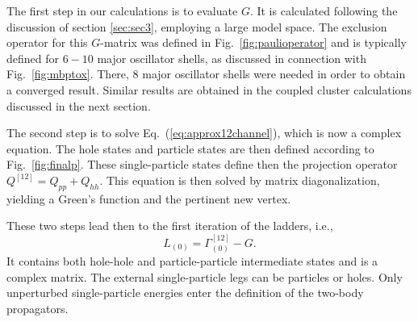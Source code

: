 \documentclass[twoside,12pt]{article}
\begin{document}
The first step in our calculations is to evaluate $G$.  It is 
calculated following the discussion of section \ref{sec:sec3}, employing a
large model space.
The exclusion operator for this $G$-matrix was defined in
Fig.~\ref{fig:paulioperator} and is typically defined for $6-10$ major oscillator shells,
as discussed in connection with Fig.~\ref{fig:mbptox}. There, 8 major oscillator shells
were needed in order to obtain a converged result. Similar results are obtained
in the coupled cluster calculations discussed in the next section.

The second step is to solve Eq.\ (\ref{eq:approx12channel}),
which is now a complex equation. 
The hole states and particle states are then defined according to Fig.~\ref{fig:finalp}.
These single-particle states define then the projection operator  $Q^{[12]}=Q_{pp}+Q_{hh}$.
This equation is then solved by matrix diagonalization, yielding a Green's function and the 
pertinent new vertex.

These two steps lead then to the first iteration of
the ladders, i.e.,
\begin{equation}
     L_{(0)}=\Gamma^{[12]}_{(0)}-G.
\end{equation} 
It contains both hole-hole and particle-particle intermediate
states and is a complex matrix. The external single-particle
legs can be particles or holes. Only unperturbed single-particle 
energies enter the definition of the two-body propagators.
\end{document}
